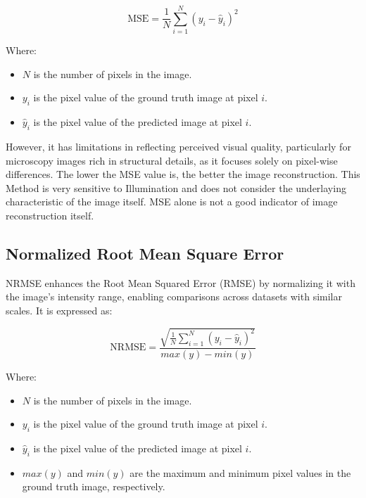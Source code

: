 \documentclass[11pt,
  paper=a4, 
  bibliography=totocnumbered,
	captions=tableheading,
	BCOR=10mm
]{scrreprt}
\theoremstyle{definition}
\begin{document}
\vspace{1cm}
\noindent

\begin{equation}
\label{eq:MSE}
\text{MSE} = \frac{1}{N} \sum_{i=1}^{N} (y_i - \hat{y}_i)^2
\end{equation}

Where:

\begin{itemize}
	\item \(N\) is the number of pixels in the image.
	\item \(y_i\) is the pixel value of the ground truth image at pixel \(i\).
	\item \(\hat{y}_i\) is the pixel value of the predicted image at pixel \(i\).
\end{itemize}

\vspace{1cm}
\noindent
However, it has limitations in reflecting perceived visual quality, particularly for microscopy images rich in structural details,
as it focuses solely on pixel-wise differences. The lower the MSE value is, the better the image reconstruction. This Method is very sensitive
to Illumination and does not consider the underlaying characteristic of the image itself. MSE alone is not a good indicator of image reconstruction itself.



\subsection{Normalized Root Mean Square Error}
NRMSE enhances the Root Mean Squared Error (RMSE) by normalizing it with the image’s intensity range, enabling comparisons across datasets with similar scales.
It is expressed as:
\vspace{1cm}
\noindent


\begin{equation}
\label{eq:NRMSE}
\text{NRMSE} = \frac{\sqrt{\frac{1}{N} \sum_{i=1}^{N} (y_i - \hat{y}_i)^2}}{max(y) - min(y)}
\end{equation}

Where:

\begin{itemize}
	\item \(N\) is the number of pixels in the image.
	\item \(y_i\) is the pixel value of the ground truth image at pixel \(i\).
	\item \(\hat{y}_i\) is the pixel value of the predicted image at pixel \(i\).
	\item \(max(y)\) and \(min(y)\) are the maximum and minimum pixel values in the ground truth image, respectively.
\end{itemize}
\end{document}
